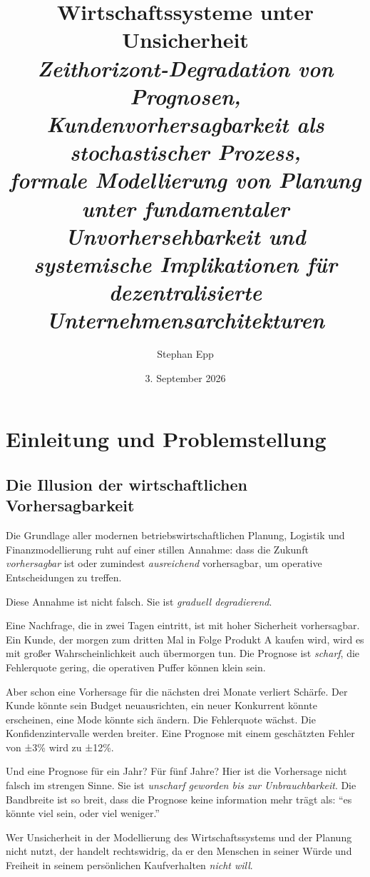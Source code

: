 \documentclass[12pt, a4paper, titlepage]{report}
\title{\textbf{Wirtschaftssysteme unter Unsicherheit}\\
  {\Large\itshape Zeithorizont-Degradation von Prognosen, Kundenvorhersagbarkeit als stochastischer Prozess,\\
   formale Modellierung von Planung unter fundamentaler Unvorhersehbarkeit und systemische Implikationen für dezentralisierte Unternehmensarchitekturen}}
\author{Stephan Epp}
\date{3. September 2026}
\theoremstyle{definition}
\theoremstyle{remark}
\begin{document}

\maketitle
\tableofcontents
\newpage

\chapter{Einleitung und Problemstellung}

\section{Die Illusion der wirtschaftlichen Vorhersagbarkeit}

Die Grundlage aller modernen betriebswirtschaftlichen Planung, Logistik und Finanzmodellierung ruht auf einer stillen Annahme: dass die Zukunft \emph{vorhersagbar} ist oder zumindest \emph{ausreichend} vorhersagbar, um operative Entscheidungen zu treffen.

Diese Annahme ist nicht falsch. Sie ist \emph{graduell degradierend}. 

Eine Nachfrage, die in zwei Tagen eintritt, ist mit hoher Sicherheit vorhersagbar. Ein Kunde, der morgen zum dritten Mal in Folge Produkt A kaufen wird, wird es mit großer Wahrscheinlichkeit auch übermorgen tun. Die Prognose ist \emph{scharf}, die Fehlerquote gering, die operativen Puffer können klein sein.

Aber schon eine Vorhersage für die nächsten drei Monate verliert Schärfe. Der Kunde könnte sein Budget neuausrichten, ein neuer Konkurrent könnte erscheinen, eine Mode könnte sich ändern. Die Fehlerquote wächst. Die Konfidenzintervalle werden breiter. Eine Prognose mit einem geschätzten Fehler von ±3\% wird zu ±12\%.

Und eine Prognose für ein Jahr? Für fünf Jahre? Hier ist die Vorhersage nicht falsch im strengen Sinne. Sie ist \emph{unscharf geworden bis zur Unbrauchbarkeit}. Die Bandbreite ist so breit, dass die Prognose keine information mehr trägt als: ``es könnte viel sein, oder viel weniger.''

Wer Unsicherheit in der Modellierung des Wirtschaftssystems und der Planung nicht nutzt, der handelt rechtswidrig, da er den Menschen in seiner Würde und Freiheit in seinem persönlichen Kaufverhalten \textit{nicht will}.
\end{document}
